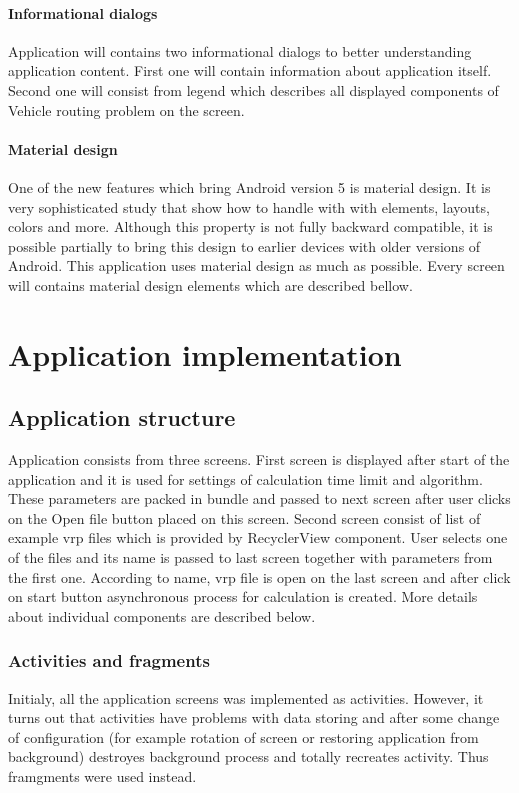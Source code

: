 \paragraph{Informational dialogs}
Application will contains two informational dialogs to better understanding application content. First one will contain
information about application itself. Second one will consist from legend which describes all displayed components of
Vehicle routing problem on the screen.

\paragraph{Material design}
One of the new features which bring Android version 5 is material design. It is very sophisticated study that show how
to handle with with elements, layouts, colors and more. Although this property is not fully backward compatible, it is
possible partially to bring this design to earlier devices with older versions of Android. This application uses
material design as much as possible. Every screen will contains material design elements which are described bellow.

\section{Application implementation}

\subsection{Application structure} %
Application consists from three screens. First screen is displayed after start of the application and it is used for
settings of calculation time limit and algorithm. These parameters are packed in bundle and passed to next screen after
user clicks on the Open file button placed on this screen. Second screen consist of list of example vrp files which is
provided by RecyclerView component. User selects one of the files and its name is passed to last screen together with
parameters from the first one. According to name, vrp file is open on the last screen and after click on start button
asynchronous process for calculation is created. More details about individual components are described below.

\subsubsection{Activities and fragments}
Initialy, all the application screens was implemented as activities. However, it turns out that activities have problems
with data storing and after some change of configuration (for example rotation of screen or restoring application from
background) destroyes background process and totally recreates activity. Thus framgments were used instead.

